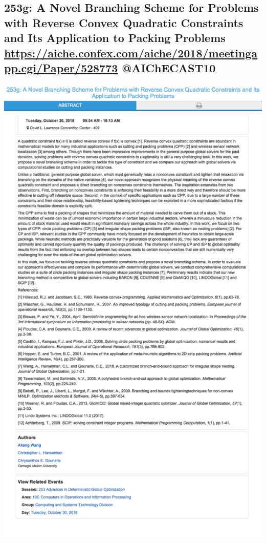 \documentclass[11pt]{article}
\begin{document}
\subsection{253g: A Novel Branching Scheme for Problems with Reverse Convex Quadratic Constraints and Its Application to Packing Problems \url{https://aiche.confex.com/aiche/2018/meetingapp.cgi/Paper/528773} @AIChECAST10}
\label{sec:org279a1a9}
\begin{center}
\includegraphics[width=.9\linewidth]{./528773.png}
\end{center}
\end{document}

